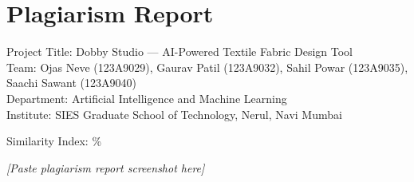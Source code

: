 \chapter*{Plagiarism Report}
Project Title: Dobby Studio — AI-Powered Textile Fabric Design Tool \\
Team: Ojas Neve (123A9029), Gaurav Patil (123A9032), 
      Sahil Powar (123A9035), Saachi Sawant (123A9040) \\
Department: Artificial Intelligence and Machine Learning \\
Institute: SIES Graduate School of Technology, Nerul, Navi Mumbai \\

\vspace{1cm}

\noindent Similarity Index: \underline{\hspace{2cm}}\% \\

\vspace{1cm}

\textit{[Paste plagiarism report screenshot here]}
